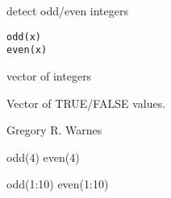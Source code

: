\begin{Description}\relax
detect odd/even integers
\end{Description}
\begin{Usage}
\begin{verbatim}
odd(x)
even(x)
\end{verbatim}
\end{Usage}
\begin{Arguments}
\begin{ldescription}
\item[\code{x}] vector of integers 
\end{ldescription}
\end{Arguments}
\begin{Value}
Vector of TRUE/FALSE values.
\end{Value}
\begin{Author}\relax
Gregory R. Warnes 
\end{Author}
\begin{SeeAlso}\relax
{}
\end{SeeAlso}
\begin{Examples}
\begin{ExampleCode}

odd(4)
even(4)

odd(1:10)
even(1:10)

\end{ExampleCode}
\end{Examples}

